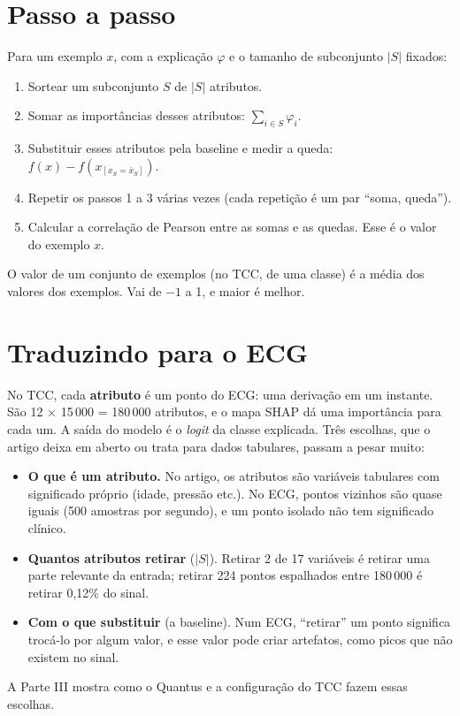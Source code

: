 \documentclass[11pt,a4paper]{article}
\begin{document}
\section{Passo a passo}
Para um exemplo $x$, com a explicação $\varphi$ e o tamanho de subconjunto $|S|$ fixados:
\begin{enumerate}
\item Sortear um subconjunto $S$ de $|S|$ atributos.
\item Somar as importâncias desses atributos: $\sum_{i \in S} \varphi_i$.
\item Substituir esses atributos pela baseline e medir a queda: $f(x) - f(x_{[x_S = \bar{x}_S]})$.
\item Repetir os passos 1 a 3 várias vezes (cada repetição é um par “soma, queda”).
\item Calcular a correlação de Pearson entre as somas e as quedas. Esse é o valor do exemplo $x$.
\end{enumerate}
O valor de um conjunto de exemplos (no TCC, de uma classe) é a média dos valores dos exemplos. Vai de $-1$ a 1, e maior é melhor.

\section{Traduzindo para o ECG}
No TCC, cada \textbf{atributo} é um ponto do ECG: uma derivação em um instante. São 12 × 15\,000 = 180\,000 atributos, e o mapa SHAP dá uma importância para cada um. A saída do modelo é o \textit{logit} da classe explicada. Três escolhas, que o artigo deixa em aberto ou trata para dados tabulares, passam a pesar muito:
\begin{itemize}
\item \textbf{O que é um atributo.} No artigo, os atributos são variáveis tabulares com significado próprio (idade, pressão etc.). No ECG, pontos vizinhos são quase iguais (500 amostras por segundo), e um ponto isolado não tem significado clínico.
\item \textbf{Quantos atributos retirar} ($|S|$). Retirar 2 de 17 variáveis é retirar uma parte relevante da entrada; retirar 224 pontos espalhados entre 180\,000 é retirar 0,12\% do sinal.
\item \textbf{Com o que substituir} (a baseline). Num ECG, “retirar” um ponto significa trocá-lo por algum valor, e esse valor pode criar artefatos, como picos que não existem no sinal.
\end{itemize}
A Parte III mostra como o Quantus e a configuração do TCC fazem essas escolhas.
\end{document}
